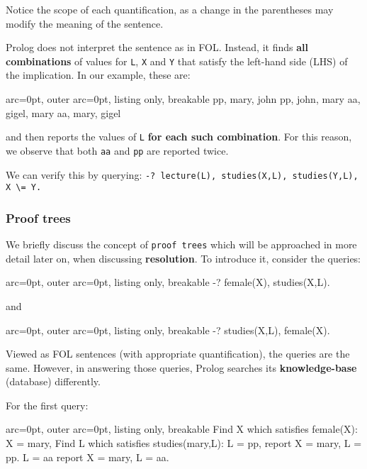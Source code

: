 Notice the scope of each quantification, as a change in the parentheses may modify the meaning of the sentence.

Prolog does not interpret the sentence as in FOL. Instead, it finds \textbf{all combinations} of values for \texttt{L}, \texttt{X} and \texttt{Y} that satisfy the left-hand side (LHS) of the implication. In our example, these are:


\begin{tcblisting}{ arc=0pt, outer arc=0pt, listing only, breakable}
pp, mary, john
pp, john, mary
aa, gigel, mary
aa, mary, gigel

\end{tcblisting}


and then reports the values of \texttt{L} \textbf{for each such combination}. For this reason, we observe that both \texttt{aa} and \texttt{pp} are reported twice.

We can verify this by querying: \texttt{-? lecture(L), studies(X,L), studies(Y,L), X \textbackslash = Y.}

\subsubsection*{ Proof trees }

We briefly discuss the concept of \texttt{proof trees} which will be approached in more detail later on, when discussing \textbf{resolution}. To introduce it, consider the queries:

\begin{tcblisting}{ arc=0pt, outer arc=0pt, listing only, breakable}
-? female(X), studies(X,L).

\end{tcblisting}


and 

\begin{tcblisting}{ arc=0pt, outer arc=0pt, listing only, breakable}
-? studies(X,L), female(X).

\end{tcblisting}


Viewed as FOL sentences (with appropriate quantification), the queries are the same. However, in answering those queries, Prolog searches its \textbf{knowledge-base} (database) differently.

For the first query:

\begin{tcblisting}{ arc=0pt, outer arc=0pt, listing only, breakable}
Find X which satisfies female(X):
  X = mary,
  Find L which satisfies studies(mary,L):
  L = pp,
    report X = mary, L = pp.
  L = aa
    report X = mary, L = aa.

\end{tcblisting}


